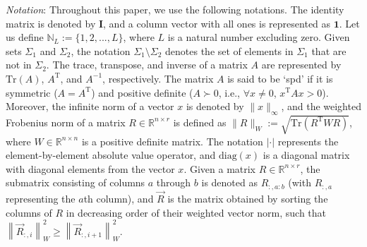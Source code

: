 	\textit{Notation}: Throughout this paper, we use the following notations. The identity matrix is denoted by $\mathbf{I}$, and a column vector with all ones is represented as $\mathbf{1}$. Let us define $\mathbb{N}_L := \{1,2,...,L\}$, where $L$ is a natural number excluding zero. Given sets $\Sigma_1$ and $\Sigma_2$, the notation $\Sigma_1 \setminus \Sigma_2$ denotes the set of elements in $\Sigma_1$ that are not in $\Sigma_2$. The trace, transpose, and inverse of a matrix $A$ are represented by $\mathrm{Tr}(A)$, $A^{\mathrm{T}}$, and $A^{-1}$, respectively. The matrix $A$ is said to be `spd' if it is symmetric ($A=A^{\mathrm{T}}$) and positive definite ($A \succ 0$, i.e., $\forall x \neq 0$, $x^{\mathrm{T}}Ax > 0$). Moreover, the infinite norm of a vector $x$ is denoted by $\|x\|_{\infty}$, and the weighted Frobenius norm of a matrix $R \in \mathbb{R}^{n \times r}$ is defined as $\|R\|_{W} := \sqrt{\mathrm{Tr}(R^{\mathrm{T}}WR)}$, where $W \in \mathbb{R}^{n \times n}$ is a positive definite matrix. The notation $|\cdot|$ represents the element-by-element absolute value operator, and $\mathrm{diag}(x)$ is a diagonal matrix with diagonal elements from the vector $x$. Given a matrix $R \in \mathbb{R}^{n \times r}$, the submatrix consisting of columns $a$ through $b$ is denoted as $R_{:,a:b}$ (with $R_{:,a}$ representing the $a$th column), and $\vec{R}$ is the matrix obtained by sorting the columns of $R$ in decreasing order of their weighted vector norm, such that $\left\|\vec{R}_{:, i}\right\|_W^2 \ge \left\|\vec{R}_{:, i+1}\right\|_W^2$.